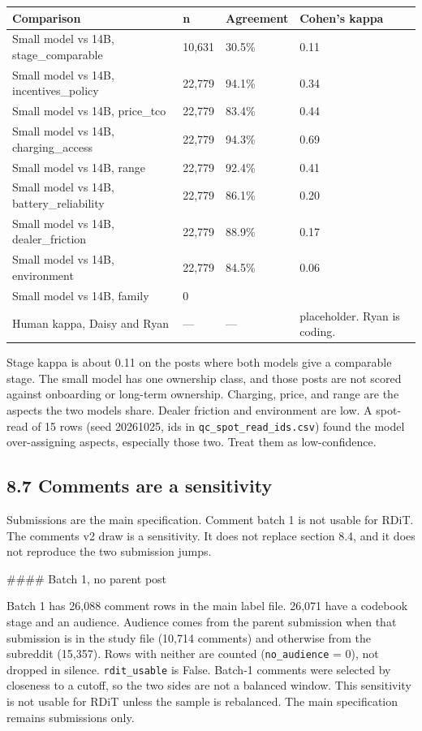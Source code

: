 \documentclass[11pt]{article}
\begin{document}
\begin{longtable}{llll}
\toprule
Comparison & n & Agreement & Cohen's kappa \\
\midrule
Small model vs 14B, stage\_comparable & 10,631 & 30.5\% & 0.11 \\
Small model vs 14B, incentives\_policy & 22,779 & 94.1\% & 0.34 \\
Small model vs 14B, price\_tco & 22,779 & 83.4\% & 0.44 \\
Small model vs 14B, charging\_access & 22,779 & 94.3\% & 0.69 \\
Small model vs 14B, range & 22,779 & 92.4\% & 0.41 \\
Small model vs 14B, battery\_reliability & 22,779 & 86.1\% & 0.20 \\
Small model vs 14B, dealer\_friction & 22,779 & 88.9\% & 0.17 \\
Small model vs 14B, environment & 22,779 & 84.5\% & 0.06 \\
Small model vs 14B, family & 0 &  &  \\
Human kappa, Daisy and Ryan & — & — & placeholder. Ryan is coding. \\
\bottomrule
\end{longtable}


Stage kappa is about 0.11 on the posts where both models give a comparable stage. The small model has one ownership class, and those posts are not scored against onboarding or long-term ownership. Charging, price, and range are the aspects the two models share. Dealer friction and environment are low. A spot-read of 15 rows (seed 20261025, ids in \texttt{qc\_spot\_read\_ids.csv}) found the model over-assigning aspects, especially those two. Treat them as low-confidence.


\subsection{8.7 Comments are a sensitivity}

Submissions are the main specification. Comment batch 1 is not usable for RDiT. The comments v2 draw is a sensitivity. It does not replace section 8.4, and it does not reproduce the two submission jumps.


\#\#\#\# Batch 1, no parent post


Batch 1 has 26,088 comment rows in the main label file. 26,071 have a codebook stage and an audience. Audience comes from the parent submission when that submission is in the study file (10,714 comments) and otherwise from the subreddit (15,357). Rows with neither are counted (\texttt{no\_audience} = 0), not dropped in silence. \texttt{rdit\_usable} is False. Batch-1 comments were selected by closeness to a cutoff, so the two sides are not a balanced window. This sensitivity is not usable for RDiT unless the sample is rebalanced. The main specification remains submissions only.
\end{document}
